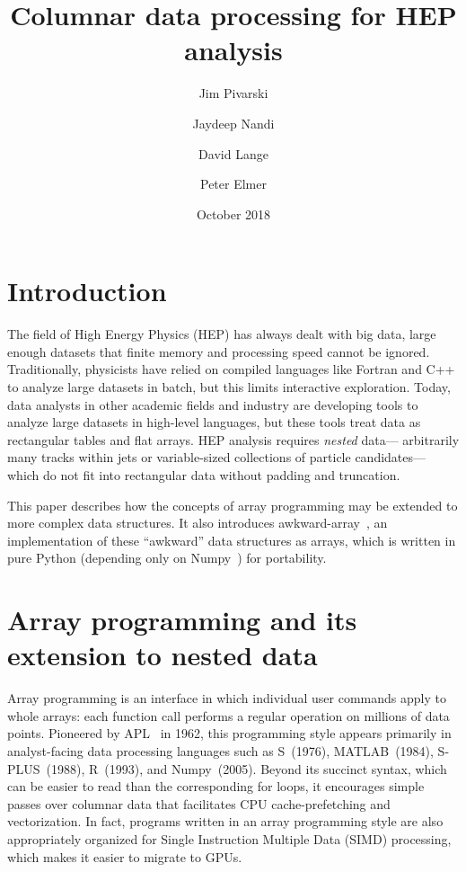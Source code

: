 \documentclass{webofc}
\title{Columnar data processing for HEP analysis}
\author{Jim Pivarski\inst{1} \and Jaydeep Nandi\inst{2} \and David Lange\inst{1} \and Peter Elmer\inst{1}}
\date{October 2018}
\begin{document}

\maketitle

\section{Introduction}

The field of High Energy Physics (HEP) has always dealt with big data, large enough datasets that finite memory and processing speed cannot be ignored. Traditionally, physicists have relied on compiled languages like Fortran and C++ to analyze large datasets in batch, but this limits interactive exploration. Today, data analysts in other academic fields and industry are developing tools to analyze large datasets in high-level languages, but these tools treat data as rectangular tables and flat arrays. HEP analysis requires {\it nested} data--- arbitrarily many tracks within jets or variable-sized collections of particle candidates--- which do not fit into rectangular data without padding and truncation.

This paper describes how the concepts of array programming may be extended to more complex data structures. It also introduces awkward-array~\cite{awkward}, an implementation of these ``awkward'' data structures as arrays, which is written in pure Python (depending only on Numpy~\cite{numpy}) for portability.

\section{Array programming and its extension to nested data}

Array programming is an interface in which individual user commands apply to whole arrays: each function call performs a regular operation on millions of data points. Pioneered by APL~\cite{apl} in 1962, this programming style appears primarily in analyst-facing data processing languages such as S~(1976), MATLAB~(1984), S-PLUS~(1988), R~(1993), and Numpy~(2005). Beyond its succinct syntax, which can be easier to read than the corresponding for loops, it encourages simple passes over columnar data that facilitates CPU cache-prefetching and vectorization. In fact, programs written in an array programming style are also appropriately organized for Single Instruction Multiple Data (SIMD) processing, which makes it easier to migrate to GPUs.
\end{document}
